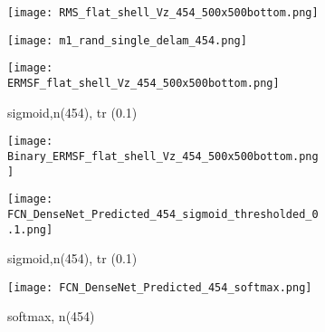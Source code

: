 	\begin{figure} [h!]
		\centering
		\begin{subfigure}[b]{0.47\textwidth}
			\centering
			\texttt{[image: RMS\_flat\_shell\_Vz\_454\_500x500bottom.png]}
			\caption{}
			\label{fig:dispersion30deg_direct}
		\end{subfigure}
		\hfill
		\begin{subfigure}[b]{0.47\textwidth}
			\centering
			\texttt{[image: m1\_rand\_single\_delam\_454.png]}
			\caption{}
			\label{fig:m1_rand_single_delam_454}
		\end{subfigure}
		\hfill
		\begin{subfigure}[b]{0.47\textwidth}
			\centering
			\texttt{[image: ERMSF\_flat\_shell\_Vz\_454\_500x500bottom.png]}
			\caption{sigmoid,n(454), tr (0.1)}
			\label{fig:ERMSF_flat_shell_Vz_454}
		\end{subfigure}
		\hfill
		\begin{subfigure}[b]{0.47\textwidth}
			\centering
			\texttt{[image: Binary\_ERMSF\_flat\_shell\_Vz\_454\_500x500bottom.png]}
			\caption{}
			\label{fig:dispersion90deg_direct}
		\end{subfigure}
		\hfill
		\begin{subfigure}[b]{0.47\textwidth}
			\centering
			\texttt{[image: FCN\_DenseNet\_Predicted\_454\_sigmoid\_thresholded\_0.1.png]}
			\caption{sigmoid,n(454), tr (0.1)}
			\label{fig:predict_454_sigmoid_tr_0.1}
		\end{subfigure}
		\hfill	
		\begin{subfigure}[b]{0.47\textwidth}
			\centering
			\texttt{[image: FCN\_DenseNet\_Predicted\_454\_softmax.png]}
			\caption{softmax, n(454)}
			\label{fig:predict_454_softmax}
		\end{subfigure}
	
	
		\caption{}
		\label{fig:predictions}
	\end{figure} 
	

